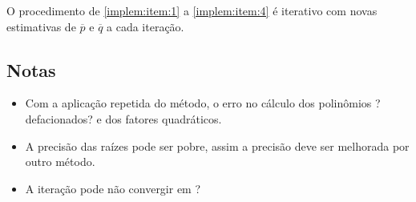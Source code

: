 O procedimento de \ref{implem:item:1} a \ref{implem:item:4}  é iterativo com novas estimativas de $\overline{p}$ e $\overline{q}$ a cada iteração.

\subsection{Notas}

\begin{itemize}
\item Com a aplicação repetida do método, o erro no cálculo dos polinômios ?defacionados? e dos fatores quadráticos.
\item A precisão das raízes pode ser pobre, assim a precisão deve ser melhorada por outro método.
\item A iteração pode não convergir em ?
\end{itemize}
